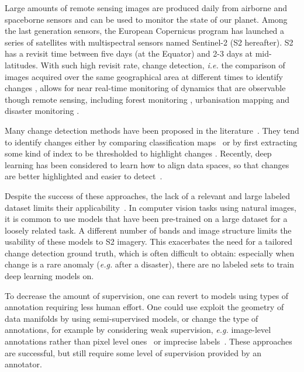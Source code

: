\documentclass[runningheads]{llncs}
\begin{document}
Large amounts of remote sensing images are produced daily from airborne and spaceborne sensors and can be used to monitor the state of our planet. Among the last generation sensors, the European Copernicus program has launched a series of satellites with multispectral sensors named Sentinel-2 (S2 hereafter). S2 has a revisit time between five days (at the Equator) and 2-3 days at mid-latitudes. With such high revisit rate, change detection, \emph{i.e.} the comparison of images acquired over the same geographical area at different times to identify changes \cite{Liu:2019:review_multispectral_cd}, {allows for near real-time monitoring of dynamics that are observable though remote sensing, including} forest monitoring  \cite{Verbesselt:2010:trend_seasonal_timeseries,Hamunyela:2016:spatial_context_bfast}, urbanisation mapping \cite{Deng:2009:urbanization,Huang:2017:urbanisation} and disaster monitoring \cite{Brunner:2010:multi_sensor_CD_disaster,Longbotham:2012:data_fusion_contest_cd}.


Many change detection methods have been proposed in the literature~\cite{Bovolo:2015:time_cd}. They tend to identify changes either by comparing classification maps~\cite{Vol10e} or by first extracting some kind of index to be thresholded to highlight changes \cite{Vol14b}. Recently, deep learning has been considered to learn how to align data spaces, so that changes are better highlighted and easier to detect~\cite{Lin:2019:multispectral_bilinearCNN,Zhan:2017:siamese_cd,Peng:2019:UNet++,Mou:2019:CNN+RNN,Saha:2019:deepCVA}.


Despite the success of these approaches, the {lack of} a relevant and large labeled dataset {limits their applicability~\cite{Zhu:2017:DL_remote_sensing}.}
{In computer vision tasks using natural images, it is common to use models that have been pre-trained on a large dataset for a loosely related task. A different number of bands and image structure limits the usability of these models to S2 imagery. This exacerbates the need for a tailored change detection ground truth,} which is often difficult to obtain: especially when change is a rare anomaly (\emph{e.g.} after a disaster), there are no labeled sets to train deep learning models on.

To decrease the amount of supervision, one can revert to models using types of annotation requiring less human effort. One could use exploit the geometry of data manifolds by using semi-supervised models, or change the type of annotations, for example by considering weak supervision, \emph{e.g.} image-level annotations rather than pixel level ones~\cite{Kel19d} or imprecise labels~\cite{daudt2019gad}. These approaches are successful, but still require some level of supervision provided by an annotator.
\end{document}
